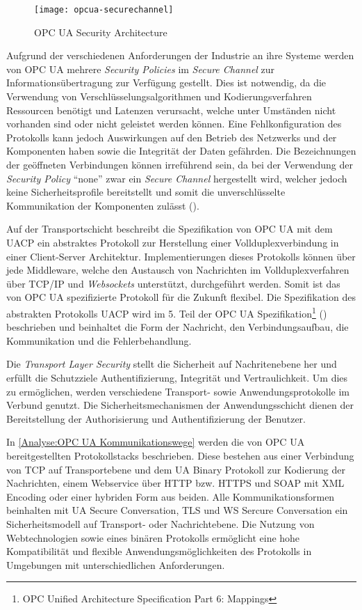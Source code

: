 \begin{figure}[h]
  \centering
  \texttt{[image: opcua-securechannel]}
  \caption{OPC UA Security Architecture} 
  \label{Analyse:OPC UA Security Architecture}
\end{figure}

Aufgrund der verschiedenen Anforderungen der Industrie an ihre Systeme werden von \ac{OPC UA} mehrere \textit{Security Policies} im \textit{Secure Channel} zur Informationsübertragung zur Verfügung gestellt. Dies ist notwendig, da die Verwendung von Verschlüsselungsalgorithmen und Kodierungsverfahren Ressourcen benötigt und Latenzen verursacht, welche unter Umständen nicht vorhanden sind oder nicht geleistet werden können. Eine Fehlkonfiguration des Protokolls kann jedoch Auswirkungen auf den Betrieb des Netzwerks und der Komponenten haben sowie die Integrität der Daten gefährden. Die Bezeichnungen der geöffneten Verbindungen können irreführend sein, da bei der Verwendung der \textit{Security Policy} "`none"' zwar ein \textit{Secure Channel} hergestellt wird, welcher jedoch keine Sicherheitsprofile bereitstellt und somit die unverschlüsselte Kommunikation der Komponenten zulässt (\cite{opcpt7}).

Auf der Transportschicht beschreibt die Spezifikation von \ac{OPC UA} mit dem \ac{UACP} ein abstraktes Protokoll zur Herstellung einer Vollduplexverbindung in einer Client-Server Architektur. Implementierungen dieses Protokolls können über jede Middleware, welche den Austausch von Nachrichten im Vollduplexverfahren über \ac{TCP}/\ac{IP} und \textit{Websockets} unterstützt, durchgeführt werden. Somit ist das von \ac{OPC UA} spezifizierte Protokoll für die Zukunft flexibel. Die Spezifikation des abstrakten Protokolls \ac{UACP} wird im 5. Teil der \ac{OPC UA} Spezifikation\footnote{OPC Unified Architecture Specification Part 6: Mappings} (\cite{opcpt5}) beschrieben und beinhaltet die Form der Nachricht, den Verbindungsaufbau, die Kommunikation und die Fehlerbehandlung.

Die \textit{Transport Layer Security} stellt die Sicherheit auf Nachritenebene her und erfüllt die Schutzziele Authentifizierung, Integrität und Vertraulichkeit. Um dies zu ermöglichen, werden verschiedene Transport- sowie Anwendungsprotokolle im Verbund genutzt. Die Sicherheitsmechanismen der Anwendungsschicht dienen der Bereitstellung der Authorisierung und Authentifizierung der Benutzer.

In \autoref{Analyse:OPC UA Kommunikationswege} werden die von \ac{OPC UA} bereitgestellten Protokollstacks beschrieben. Diese bestehen aus einer Verbindung von \ac{TCP} auf Transportebene und dem \ac{UA} Binary Protokoll zur Kodierung der Nachrichten, einem Webservice über \ac{HTTP} bzw. \ac{HTTPS} und \ac{SOAP} mit \ac{XML} Encoding oder einer hybriden Form aus beiden. Alle Kommunikationsformen beinhalten mit \ac{UA} Secure Conversation, \ac{TLS} und \ac{WS} Sercure Conversation ein Sicherheitsmodell auf Transport- oder Nachrichtebene. Die Nutzung von Webtechnologien sowie eines binären Protokolls ermöglicht eine hohe Kompatibilität und flexible Anwendungsmöglichkeiten des Protokolls in Umgebungen mit unterschiedlichen Anforderungen.

